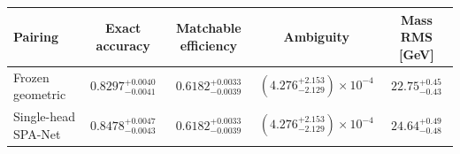 {\small
\begin{tabular}{lcccc}
\toprule
Pairing & Exact accuracy & Matchable efficiency & Ambiguity & Mass RMS [GeV] \\
\midrule
Frozen geometric & $0.8297^{+0.0040}_{-0.0041}$ & $0.6182^{+0.0033}_{-0.0039}$ & $(4.276^{+2.153}_{-2.129})\times10^{-4}$ & $22.75^{+0.45}_{-0.43}$ \\
Single-head SPA-Net & $0.8478^{+0.0047}_{-0.0043}$ & $0.6182^{+0.0033}_{-0.0039}$ & $(4.276^{+2.153}_{-2.129})\times10^{-4}$ & $24.64^{+0.49}_{-0.48}$ \\
\bottomrule
\end{tabular}
}
\par\medskip
